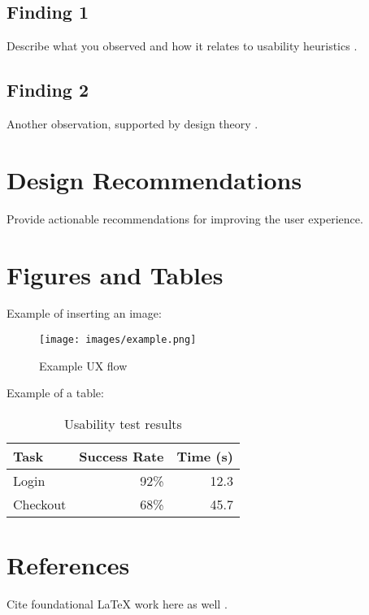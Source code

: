 \documentclass[12pt]{article}
\begin{document}
\subsection{Finding 1}
Describe what you observed and how it relates to usability heuristics \cite{nielsen1994}.
\subsection{Finding 2}
Another observation, supported by design theory \cite{norman2013}.

\section{Design Recommendations}
Provide actionable recommendations for improving the user experience.

\section{Figures and Tables}
Example of inserting an image:
\begin{figure}[h]
    \centering
    \texttt{[image: images/example.png]}
    \caption{Example UX flow}
\end{figure}

Example of a table:
\begin{table}[h]
\centering
\begin{tabular}{lrr}
\hline
Task & Success Rate & Time (s) \\ \hline
Login & 92\% & 12.3 \\
Checkout & 68\% & 45.7 \\ \hline
\end{tabular}
\caption{Usability test results}
\end{table}

\section{References}
Cite foundational LaTeX work here as well \cite{knuth1990}.

\printbibliography
\end{document}
